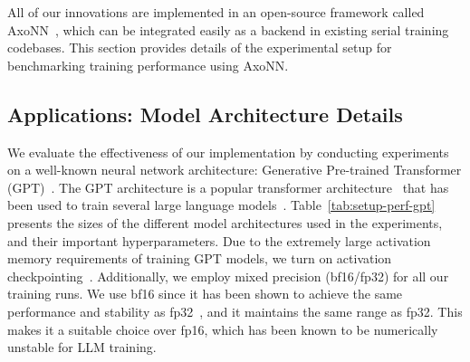 



All of our innovations are implemented in an open-source framework called
AxoNN~\cite{singh:ipdps2022}, which can be integrated easily as a backend in
existing serial training codebases. This section provides details of the
experimental setup for benchmarking training performance using AxoNN.

\subsection{Applications: Model Architecture Details} \label{sec:setup-desc}
  
We evaluate the effectiveness of our implementation by conducting experiments
on a well-known neural network architecture: Generative Pre-trained Transformer
(GPT)~\cite{gpt-3}. The GPT architecture is a popular transformer
architecture~\cite{transformer} that has been used to train several large
language models~\cite{megatron-turing-nlg-530b, bloom176b, gpt-3, gpt-2}.
Table~\ref{tab:setup-perf-gpt} presents the sizes of the different model
architectures used in the experiments, and their important hyperparameters. Due
to the extremely large activation memory requirements of training GPT models,
we turn on activation checkpointing~\cite{chen2016training}. Additionally, we
employ mixed precision (bf16/fp32) for all our training runs. We use bf16 since
it has been shown to achieve the same performance and stability as
fp32~\cite{bfloat16studyfordl}, and it maintains the same range as fp32. This
makes it a suitable choice over fp16, which has  been known to be numerically
unstable for LLM training.


